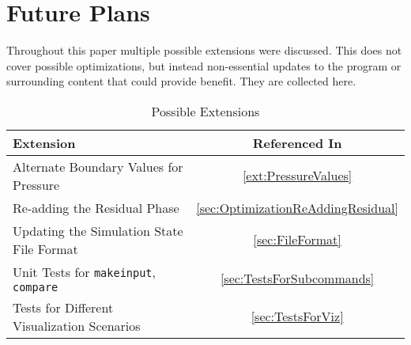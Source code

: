 \chapter{Future Plans}
\label{sec:FuturePlansAppendix}
Throughout this paper multiple possible extensions were discussed.
This does not cover possible optimizations, but instead non-essential updates to the program or surrounding content that could provide benefit.
They are collected here.

\begin{table}[h]
    \centering
    \begin{tabular}{l|c}
        Extension & Referenced In \\
        \hline
        Alternate Boundary Values for Pressure & \cref{ext:PressureValues} \\
        Re-adding the Residual Phase & \cref{sec:OptimizationReAddingResidual} \\
        Updating the Simulation State File Format & \cref{sec:FileFormat} \\
        Unit Tests for \texttt{makeinput}, \texttt{compare} & \cref{sec:TestsForSubcommands} \\
        Tests for Different Visualization Scenarios & \cref{sec:TestsForViz} \\
    \end{tabular}
    \caption{Possible Extensions}
    \label{tab:PossibleExtensions}
\end{table}
